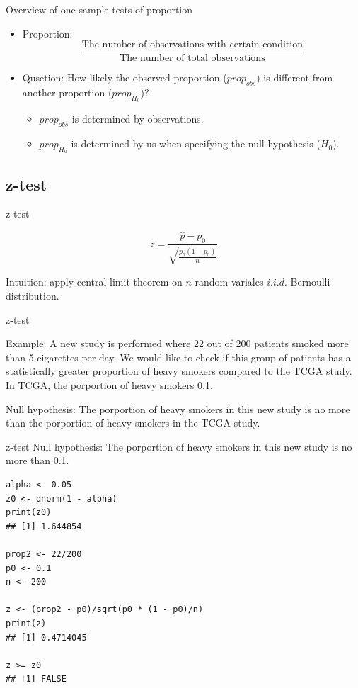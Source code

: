 \documentclass[12pt, t, xcolor=dvipsnames]{beamer}
\begin{document}
\begin{frame}{Overview of one-sample tests of proportion}
\begin{itemize}
  \item Proportion: $$\frac{\text{The number of observations with certain condition}}{\text{The number of total observations}}$$
  \item Qusetion: How likely the observed proportion ($prop_{obs}$) is different from another proportion ($prop_{H_0}$)?
  \begin{itemize}
    \item $prop_{obs}$ is determined by observations.
    \item $prop_{H_0}$ is determined by us when specifying the null hypothesis ($H_0$).
  \end{itemize}
  
\end{itemize}
\end{frame}


\subsection{z-test}

\begin{frame}[fragile]{z-test}

$$z = \frac{\hat{p} -p_0}{\sqrt{\frac{p_0 (1- p_0)}{n}}}$$

Intuition: apply central limit theorem on $n$ random variales $i.i.d.$ Bernoulli distribution.
\end{frame}

\begin{frame}[fragile]{z-test}

Example: A new study is performed where 22 out of 200 patients smoked more than 5 cigarettes per day. We would like to check if this group of patients has a statistically greater proportion of heavy smokers compared to the TCGA study. In TCGA, the porportion of heavy smokers 0.1. 

Null hypothesis: The porportion of heavy smokers in this new study is no more than the porportion of heavy smokers in the TCGA study. 

\end{frame}

\begin{frame}[fragile]{z-test}
Null hypothesis: The porportion of heavy smokers in this new study is no more than 0.1. 

\begin{verbatim}
alpha <- 0.05
z0 <- qnorm(1 - alpha)
print(z0)
## [1] 1.644854

prop2 <- 22/200
p0 <- 0.1
n <- 200

z <- (prop2 - p0)/sqrt(p0 * (1 - p0)/n)
print(z)
## [1] 0.4714045

z >= z0
## [1] FALSE
\end{verbatim}
\end{frame}
\end{document}
